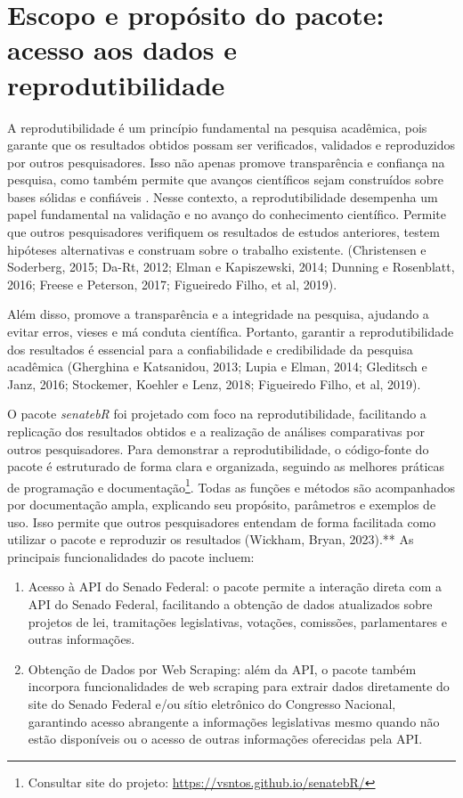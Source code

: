 \documentclass{article}
\begin{document}
\section{Escopo e propósito do pacote: acesso aos dados e
reprodutibilidade}\label{escopo-e-propuxf3sito-do-pacote-acesso-aos-dados-e-reprodutibilidade}

A reprodutibilidade é um princípio fundamental na pesquisa acadêmica,
pois garante que os resultados obtidos possam ser verificados, validados
e reproduzidos por outros pesquisadores. Isso não apenas promove
transparência e confiança na pesquisa, como também permite que avanços
científicos sejam construídos sobre bases sólidas e confiáveis . Nesse
contexto, a reprodutibilidade desempenha um papel fundamental na
validação e no avanço do conhecimento científico. Permite que outros
pesquisadores verifiquem os resultados de estudos anteriores, testem
hipóteses alternativas e construam sobre o trabalho existente.
(Christensen e Soderberg, 2015; Da-Rt, 2012; Elman e Kapiszewski, 2014;
Dunning e Rosenblatt, 2016; Freese e Peterson, 2017; Figueiredo Filho,
et al, 2019).

Além disso, promove a transparência e a integridade na pesquisa,
ajudando a evitar erros, vieses e má conduta científica. Portanto,
garantir a reprodutibilidade dos resultados é essencial para a
confiabilidade e credibilidade da pesquisa acadêmica (Gherghina e
Katsanidou, 2013; Lupia e Elman, 2014; Gleditsch e Janz, 2016;
Stockemer, Koehler e Lenz, 2018; Figueiredo Filho, et al, 2019).

O pacote \emph{senatebR} foi projetado com foco na reprodutibilidade,
facilitando a replicação dos resultados obtidos e a realização de
análises comparativas por outros pesquisadores. Para demonstrar a
reprodutibilidade, o código-fonte do pacote é estruturado de forma clara
e organizada, seguindo as melhores práticas de programação e
documentação\footnote{Consultar site do projeto:
  \url{https://vsntos.github.io/senatebR/}}. Todas as funções e métodos
são acompanhados por documentação ampla, explicando seu propósito,
parâmetros e exemplos de uso. Isso permite que outros pesquisadores
entendam de forma facilitada como utilizar o pacote e reproduzir os
resultados (Wickham, Bryan, 2023).** As principais funcionalidades do
pacote incluem:

\begin{enumerate}
\def\labelenumi{\Roman{enumi})}
\item
  Acesso à API do Senado Federal: o pacote permite a interação direta
  com a API do Senado Federal, facilitando a obtenção de dados
  atualizados sobre projetos de lei, tramitações legislativas, votações,
  comissões, parlamentares e outras informações.
\item
  Obtenção de Dados por Web Scraping: além da API, o pacote também
  incorpora funcionalidades de web scraping para extrair dados
  diretamente do site do Senado Federal e/ou sítio eletrônico do
  Congresso Nacional, garantindo acesso abrangente a informações
  legislativas mesmo quando não estão disponíveis ou o acesso de outras
  informações oferecidas pela API.
\end{enumerate}
\end{document}
